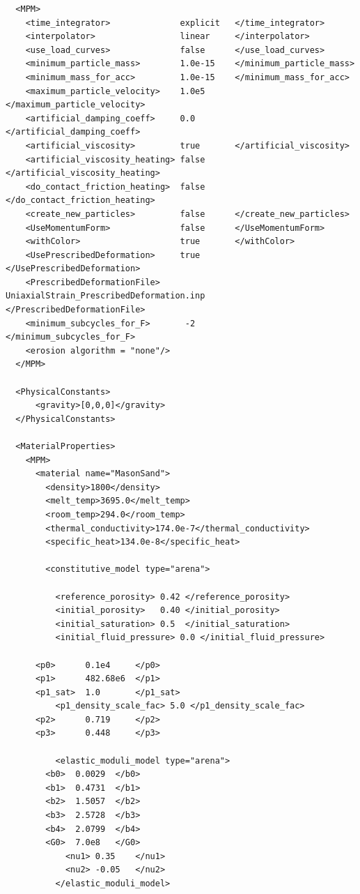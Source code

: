 \documentclass[11pt,a4paper]{article}
\begin{document}
\begin{lstlisting}
  <MPM>
    <time_integrator>              explicit   </time_integrator>
    <interpolator>                 linear     </interpolator>
    <use_load_curves>              false      </use_load_curves>
    <minimum_particle_mass>        1.0e-15    </minimum_particle_mass>
    <minimum_mass_for_acc>         1.0e-15    </minimum_mass_for_acc>
    <maximum_particle_velocity>    1.0e5      </maximum_particle_velocity>
    <artificial_damping_coeff>     0.0        </artificial_damping_coeff>
    <artificial_viscosity>         true       </artificial_viscosity>
    <artificial_viscosity_heating> false      </artificial_viscosity_heating>
    <do_contact_friction_heating>  false      </do_contact_friction_heating>
    <create_new_particles>         false      </create_new_particles>
    <UseMomentumForm>              false      </UseMomentumForm>
    <withColor>                    true       </withColor>
    <UsePrescribedDeformation>     true       </UsePrescribedDeformation>
    <PrescribedDeformationFile>    UniaxialStrain_PrescribedDeformation.inp   </PrescribedDeformationFile>
    <minimum_subcycles_for_F>       -2        </minimum_subcycles_for_F>
    <erosion algorithm = "none"/>
  </MPM>

  <PhysicalConstants>
      <gravity>[0,0,0]</gravity>
  </PhysicalConstants>

  <MaterialProperties>
    <MPM>
      <material name="MasonSand">
        <density>1800</density>
        <melt_temp>3695.0</melt_temp>
        <room_temp>294.0</room_temp>
        <thermal_conductivity>174.0e-7</thermal_conductivity>
        <specific_heat>134.0e-8</specific_heat>

        <constitutive_model type="arena">

          <reference_porosity> 0.42 </reference_porosity>
          <initial_porosity>   0.40 </initial_porosity>
          <initial_saturation> 0.5  </initial_saturation>
          <initial_fluid_pressure> 0.0 </initial_fluid_pressure>

	  <p0>      0.1e4     </p0>
	  <p1>      482.68e6  </p1>
	  <p1_sat>  1.0       </p1_sat>
          <p1_density_scale_fac> 5.0 </p1_density_scale_fac>
	  <p2>      0.719     </p2>
	  <p3>      0.448     </p3>

          <elastic_moduli_model type="arena">
	    <b0>  0.0029  </b0>
	    <b1>  0.4731  </b1>
	    <b2>  1.5057  </b2>
	    <b3>  2.5728  </b3>
	    <b4>  2.0799  </b4>
	    <G0>  7.0e8   </G0>
            <nu1> 0.35    </nu1>
            <nu2> -0.05   </nu2>
          </elastic_moduli_model>


\end{lstlisting}
\end{document}
